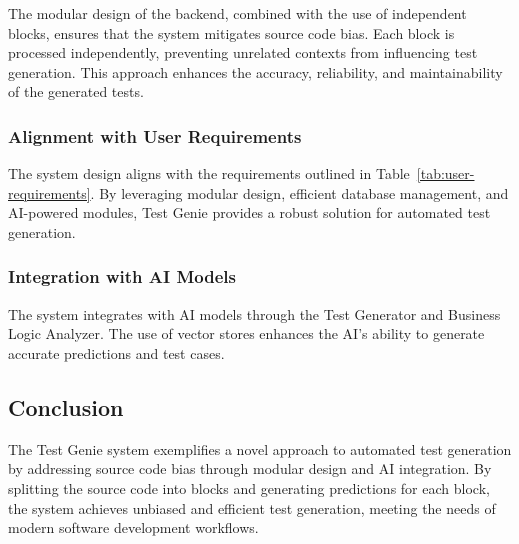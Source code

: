 The modular design of the backend, combined with the use of independent blocks, ensures that the system mitigates source code bias. Each block is processed independently, preventing unrelated contexts from influencing test generation. This approach enhances the accuracy, reliability, and maintainability of the generated tests.

\subsubsection{Alignment with User Requirements}

The system design aligns with the requirements outlined in Table~\ref{tab:user-requirements}. By leveraging modular design, efficient database management, and AI-powered modules, Test Genie provides a robust solution for automated test generation.

\subsubsection{Integration with AI Models}

The system integrates with AI models through the Test Generator and Business Logic Analyzer. The use of vector stores enhances the AI's ability to generate accurate predictions and test cases.

\subsection{Conclusion}

The Test Genie system exemplifies a novel approach to automated test generation by addressing source code bias through modular design and AI integration. By splitting the source code into blocks and generating predictions for each block, the system achieves unbiased and efficient test generation, meeting the needs of modern software development workflows.
                                                                                                                                              


